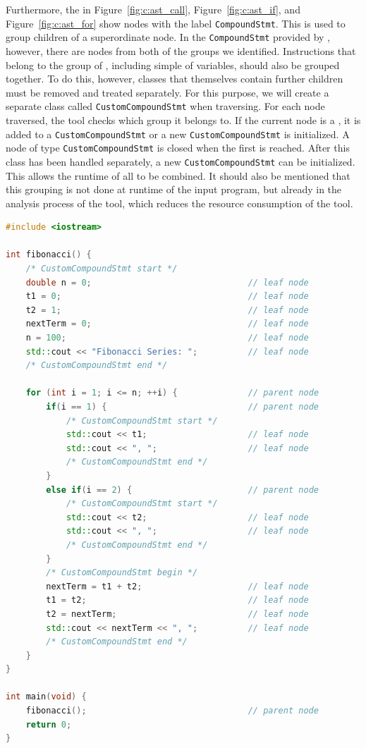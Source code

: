 Furthermore, the \asts in Figure~\ref{fig:c:ast_call}, Figure~\ref{fig:c:ast_if}, and Figure~\ref{fig:c:ast_for} show nodes with the label \lstinline{CompoundStmt}. This is used to group children of a superordinate node. In the \lstinline{CompoundStmt} provided by \CLANG, however, there are nodes from both of the groups we identified. Instructions that belong to the group of \LEASTAS, including simple \declssmall of variables, should also be grouped together. To do this, however, classes that themselves contain further children must be removed and treated separately. For this purpose, we will create a separate class called \lstinline{CustomCompoundStmt} when traversing. For each node traversed, the tool checks which group it belongs to. If the current node is a \LEASTA, it is added to a \lstinline{CustomCompoundStmt} or a new \lstinline{CustomCompoundStmt} is initialized. A node of type \lstinline{CustomCompoundStmt} is closed when the first \PARSTA is reached. After this class has been handled separately, a new \lstinline{CustomCompoundStmt} can be initialized. This allows the runtime of all \LEASTAS to be combined. It should also be mentioned that this grouping is not done at runtime of the input program, but already in the analysis process of the tool, which reduces the resource consumption of the tool. 

\begin{lstlisting}[float, language=C++, caption=Fibonacci Application Example for Analysing the Identified Groups., label=lst:c:example_categorisation]
#include <iostream>

int fibonacci() {
    /* CustomCompoundStmt start */
    double n = 0;                               // leaf node
    t1 = 0;                                     // leaf node
    t2 = 1;                                     // leaf node
    nextTerm = 0;                               // leaf node
    n = 100;                                    // leaf node
    std::cout << "Fibonacci Series: ";          // leaf node
    /* CustomCompoundStmt end */

    for (int i = 1; i <= n; ++i) {              // parent node
        if(i == 1) {                            // parent node
            /* CustomCompoundStmt start */
            std::cout << t1;                    // leaf node
            std::cout << ", ";                  // leaf node
            /* CustomCompoundStmt end */
        }
        else if(i == 2) {                       // parent node
            /* CustomCompoundStmt start */
            std::cout << t2;                    // leaf node
            std::cout << ", ";                  // leaf node
            /* CustomCompoundStmt end */
        }
        /* CustomCompoundStmt begin */
        nextTerm = t1 + t2;                     // leaf node
        t1 = t2;                                // leaf node
        t2 = nextTerm;                          // leaf node
        std::cout << nextTerm << ", ";          // leaf node
        /* CustomCompoundStmt end */
    }
}

int main(void) {
    fibonacci();                                // parent node
    return 0;
}
\end{lstlisting}

